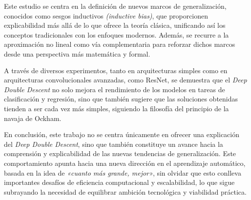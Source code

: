 Este estudio se centra en la definición de nuevos marcos de generalización, conocidos como sesgos inductivos \textit{(inductive bias)}, que proporcionen explicabilidad más allá de lo que ofrece la teoría clásica, unificando así los conceptos tradicionales con los enfoques modernos. Además, se recurre a la aproximación no lineal como vía complementaria para reforzar dichos marcos desde una perspectiva más matemática y formal.

A través de diversos experimentos, tanto en arquitecturas simples como en arquitecturas convolucionales avanzadas, como ResNet, se demuestra que el \emph{Deep Double Descent} no solo mejora el rendimiento de los modelos en tareas de clasificación y regresión, sino que también sugiere que las soluciones obtenidas tienden a ser cada vez más simples, siguiendo la filosofía del principio de la navaja de Ockham.

En conclusión, este trabajo no se centra únicamente en ofrecer una explicación del \emph{Deep Double Descent}, sino que también constituye un avance hacia la comprensión y explicabilidad de las nuevas tendencias de generalización. Este comportamiento apunta hacia una nueva dirección en el aprendizaje automático, basada en la idea de \emph{«cuanto más grande, mejor»}, sin olvidar que esto conlleva importantes desafíos de eficiencia computacional y escalabilidad, lo que sigue subrayando la necesidad de equilibrar ambición tecnológica y viabilidad práctica.
